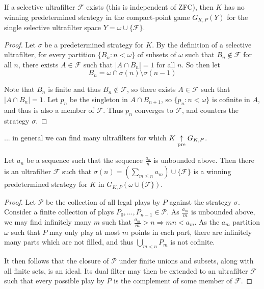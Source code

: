 \begin{prop} 
If a selective ultrafilter $\mathcal{F}$ exists (this is independent of ZFC), then $K$ has no winning predetermined strategy in the compact-point game $G_{K,P}(Y)$ for the single selective ultrafilter space $Y=\omega \cup \{\mathcal{F}\}$.
\end{prop}

\begin{proof}
Let $\sigma$ be a predetermined strategy for $K$. By the definition of a selective ultrafilter, for every partition $\{B_n : n < \omega\}$ of subsets of $\omega$ such that $B_n \not\in \mathcal{F}$ for all $n$, there exists $A \in \mathcal{F}$ such that $|A \cap B_n|=1$ for all $n$. So then let \[B_n = \omega \cap \sigma(n) \setminus \sigma(n-1)\]
  
Note that $B_n$ is finite and thus $B_n \not\in \mathcal{F}$, so there exists $A\in \mathcal{F}$ such that $|A \cap B_n|=1$. Let $p_n$ be the singleton in $A \cap B_{n+1}$, so $\{p_n : n < \omega\}$ is cofinite in $A$, and thus is also a member of $\mathcal{F}$. Thus $p_n$ converges to $\mathcal{F}$, and counters the strategy $\sigma$.
\end{proof}

... in general we can find many ultrafilters for which $K\underset{\text{pre}}{\uparrow} G_{K,P}$.

\begin{thm}
Let $a_n$ be a sequence such that the sequence $\frac{a_n}{n}$ is unbounded above. Then there is an ultrafilter $\mathcal{F}$ such that $\sigma(n)=(\sum_{m\leq n} a_m )\cup \{\mathcal{F}\}$ is a winning predetermined strategy for $K$ in $G_{K,P}(\omega\cup\{\mathcal{F}\})$.
\end{thm}

\begin{proof}
Let $\mathcal{P}$ be the collection of all legal plays by $P$ against the strategy $\sigma$. Consider a finite collection of plays $P_0,\dots,P_{n-1}\in \mathcal{P}$. As $\frac{a_m}{m}$ is unbounded above, we may find infinitely many $m$ such that $\frac{a_m}{m}>n \Rightarrow mn<a_m$. As the $a_m$ partition $\omega$ such that $P$ may only play at most $m$ points in each part, there are infinitely many parts which are not filled, and thus $\bigcup_{m<n} P_m$ is not cofinite.

It then follows that the closure of $\mathcal{P}$ under finite unions and subsets, along with all finite sets, is an ideal. Its dual filter may then be extended to an ultrafilter $\mathcal{F}$ such that every possible play by $P$ is the complement of some member of $\mathcal{F}$.
\end{proof}

